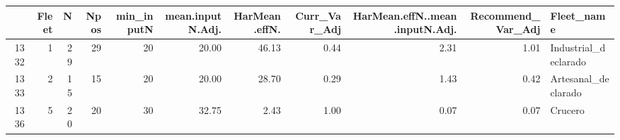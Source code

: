 \begin{table}[ht]
\centering
\begin{tabular}{rrrrrrrrrrl}
  \hline
 & Fleet & N & Npos & min\_inputN & mean.inputN.Adj. & HarMean.effN. & Curr\_Var\_Adj & HarMean.effN..mean.inputN.Adj. & Recommend\_Var\_Adj & Fleet\_name \\ 
  \hline
1332 &   1 &  29 &  29 &  20 & 20.00 & 46.13 & 0.44 & 2.31 & 1.01 & Industrial\_declarado \\ 
  1333 &   2 &  15 &  15 &  20 & 20.00 & 28.70 & 0.29 & 1.43 & 0.42 & Artesanal\_declarado \\ 
  1336 &   5 &  20 &  20 &  30 & 32.75 & 2.43 & 1.00 & 0.07 & 0.07 & Crucero \\ 
   \hline
\end{tabular}
\end{table}
